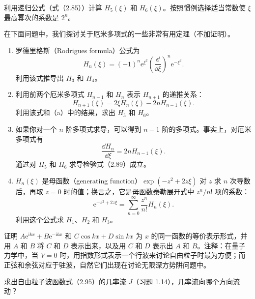利用递归公式（式（2.85））计算 $H_5(\xi)$ 和 $H_6(\xi)$。按照惯例选择适当常数使 $\xi$ 最高幂次的系数是 $2^n$。
\vfill

在下面问题中，我们探讨关于厄米多项式的一些非常有用定理（不加证明）。
\begin{enumerate}
\item 罗德里格斯（Rodrigues formula）公式为
\[
H_n(\xi)=(-1)^n\mathrm{e}^{\xi^2}
\left(\frac{\dd}{\dd\xi}\right)^n\mathrm{e}^{-\xi^2}.
\]
利用该式推导出 $H_3$ 和 $H_4$。
\item 利用前两个厄米多项式 $H_{n-1}$ 和 $H_n$ 表示 $H_{n+1}$ 的递推关系：
\[
H_{n+1}(\xi)=2\xi H_n(\xi)-2nH_{n-1}(\xi).
\]
利用该式和（a）中的结果，求出 $H_5$ 和 $H_6$。
\item 如果你对一个 $n$ 阶多项式求导，可以得到 $n-1$ 阶的多项式。事实上，对厄米多项式有
\[
\frac{\dd H_n}{\dd\xi}=2nH_{n-1}(\xi).
\]
通过对 $H_5$ 和 $H_6$ 求导检验式（2.89）成立。
\item $H_n(\xi)$ 是母函数（generating function）$\exp(-z^2+2z\xi)$ 对 $z$ 求 $n$ 次导数后，再取 $z=0$ 时的值；换言之，它是母函数泰勒展开式中 $z^n/n!$ 项的系数：
\[
\mathrm{e}^{-z^2+2z\xi}=\sum_{n=0}^{\infty}\frac{z^n}{n!}H_n(\xi).
\]
利用这个公式求 $H_1$、$H_2$ 和 $H_3$。
\end{enumerate}
\vfill

证明 $A\mathrm{e}^{\mathrm{i}kx}+B\mathrm{e}^{-\mathrm{i}kx}$ 和 $C\cos kx+D\sin kx$ 为 $x$ 的同一函数的等价表示形式，并用 $A$ 和 $B$ 将 $C$ 和 $D$ 表示出来，以及用 $C$ 和 $D$ 表示出 $A$ 和 $B$。注释：在量子力学中，当 $V=0$ 时，用指数形式表示一个行波来讨论自由粒子时最为方便；而正弦和余弦对应于驻波，自然它们出现在讨论无限深方势阱问题中。
\vfill

求出自由粒子波函数式（2.95）的几率流 $J$（习题 1.14），几率流向哪个方向流动？
\vfill

